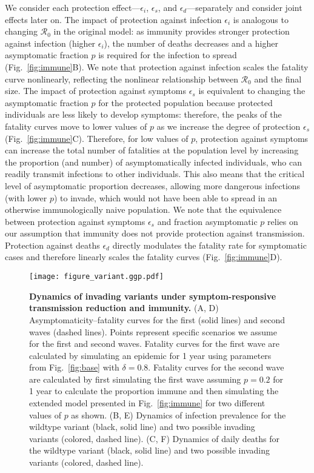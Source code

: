 \documentclass[12pt]{article}
\newcommand{\fref}[1]{Fig.~\ref{fig:#1}}
\newcommand{\RR}{\ensuremath{{\mathcal R}}\xspace}
\begin{document}
We consider each protection effect---$\epsilon_i$, $\epsilon_s$, and $\epsilon_d$---separately and consider joint effects later on.
The impact of protection against infection $\epsilon_i$ is analogous to changing $\RR_0$ in the original model: as immunity provides stronger protection against infection (higher $\epsilon_i$), the number of deaths decreases and a higher asymptomatic fraction $p$ is required for the infection to spread (\fref{immune}B).
We note that protection against infection scales the fatality curve nonlinearly, reflecting the nonlinear relationship between $\RR_0$ and the final size.
The impact of protection against symptoms $\epsilon_s$ is equivalent to changing the asymptomatic fraction $p$ for the protected population because protected individuals are less likely to develop symptoms:
therefore, the peaks of the fatality curves move to lower values of $p$ as we increase the degree of protection $\epsilon_s$ (\fref{immune}C).
Therefore, for low values of $p$, protection against symptoms can increase the total number of fatalities at the population level by increasing the proportion (and number) of asymptomatically infected individuals, who can readily transmit infections to other individuals.
This also means that the critical level of asymptomatic proportion decreases, allowing more dangerous infections (with lower $p$) to invade, which would not have been able to spread in an otherwise immunologically naive population.
We note that the equivalence between protection against symptoms $\epsilon_s$ and fraction asymptomatic $p$ relies on our assumption that immunity does not provide protection against transmission.
Protection against deaths $\epsilon_d$ directly modulates the fatality rate for symptomatic cases and therefore linearly scales the fatality curves (\fref{immune}D).

\begin{figure}[!ht]
\texttt{[image: figure\_variant.ggp.pdf]}
\caption{
\textbf{Dynamics of invading variants under symptom-responsive transmission reduction and immunity.}
(A, D) Asymptomaticity--fatality curves for the first (solid lines) and second waves (dashed lines).
Points represent specific scenarios we assume for the first and second waves.
Fatality curves for the first wave are calculated by simulating an epidemic for 1 year using parameters from \fref{base} with $\delta=0.8$.
Fatality curves for the second wave are calculated by first simulating the first wave assuming $p=0.2$ for 1 year to calculate the proportion immune and then simulating the extended model presented in \fref{immune} for two different values of $p$ as shown.
(B, E) Dynamics of infection prevalence for the wildtype variant (black, solid line) and two possible invading variants (colored, dashed line).
(C, F) Dynamics of daily deaths for the wildtype variant (black, solid line) and two possible invading variants (colored, dashed line).
}
\label{fig:variant}
\end{figure}
\end{document}
